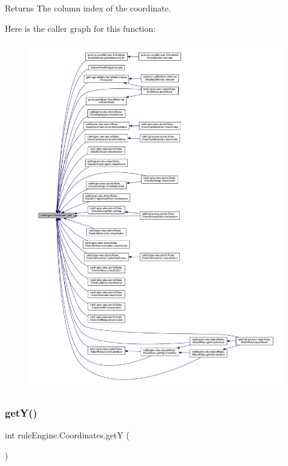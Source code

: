 \begin{DoxyReturn}{Returns}
The column index of the coordinate. 
\end{DoxyReturn}
Here is the caller graph for this function\+:
\nopagebreak
\begin{figure}[H]
\begin{center}
\leavevmode
\includegraphics[width=350pt]{classrule_engine_1_1_coordinates_a2b3c0539db7bec01491eef738487b147_icgraph}
\end{center}
\end{figure}
\mbox{\label{classrule_engine_1_1_coordinates_ad14bb7f6ecd9607d8f0110a38c6b3e87}} 
\subsubsection{\texorpdfstring{get\+Y()}{getY()}}
{\footnotesize\ttfamily int rule\+Engine.\+Coordinates.\+getY (\begin{DoxyParamCaption}{ }\end{DoxyParamCaption})\hspace{0.3cm}{\ttfamily [inline]}}

